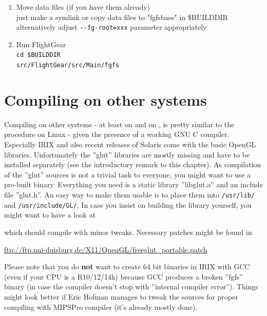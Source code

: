 \begin{enumerate}
\item Move data files (if you have them already)\\
 just make a symlink or copy data files to "fgfsbase" in {\$}BUILDDIR\\
 alternatively adjust \texttt{-$ $-fg-root=xxx} parameter appropriately

\item Run FlightGear\\
 \texttt{cd {\$}BUILDDIR}\\
 \texttt{src/FlightGear/src/Main/fgfs}
\end{enumerate}

\section{Compiling on other systems}

Compiling on other  systems - at least on  and on
, is pretty similar to the procedure on Linux - given the presence of a working GNU C compiler. Especially IRIX and also recent releases of Solaris come with the
basic OpenGL libraries. Unfortunately the ''glut'' libraries are
mostly missing and have to be installed separately (see the introductory remark to this chapter). As compilation
of the ''glut'' sources is not a trivial task to everyone, you might want to use a
pre-built binary. Everything you need is a static library ''libglut.a'' and an include
file ''glut.h''. An easy way to make them usable is to place them into \texttt{/usr/lib/}
and \texttt{/usr/include/GL/}. In case you insist on building the library yourself, you
might want to have a look at 
\medskip

 \medskip

 \noindent
which should compile with minor tweaks. Necessary patches might be found in
\medskip

\href{ftp://ftp.uni-duisburg.de/X11/OpenGL/freeglut_portable.patch}{ftp://ftp.uni-duisburg.de/X11/OpenGL/freeglut\_portable.patch}
 \medskip

 \noindent
Please note that you do \textbf{not} want to create 64 bit binaries in IRIX with
GCC (even if your CPU is a R10/12/14k) because GCC produces a broken ''fgfs'' binary (in
case the compiler doesn't stop with ''internal compiler error''). Things might look
better if Eric Hofman manages to tweak the \FlightGear{} sources for
proper compiling with MIPSPro compiler (it's already mostly done).

